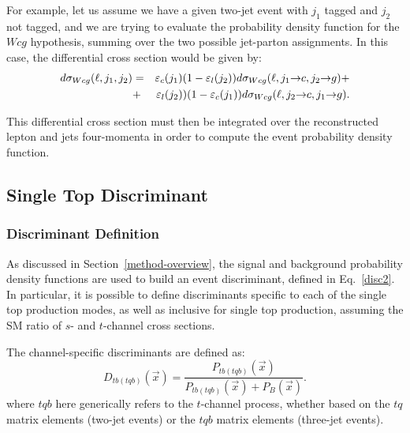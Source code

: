 For example, let us assume we have a given two-jet event with $j_1$
tagged and $j_2$ not tagged, and we are trying to evaluate the
probability density function for the $Wcg$ hypothesis, summing over
the two possible jet-parton assignments. In this case, the
differential cross section would be given by:
\begin{eqnarray}
\label{pxcomb_wcg}
d\sigma_{Wcg}(\ell, j_1, j_2)
&=& \varepsilon_{c}(j_1)(1-\varepsilon_{l}(j_2))
d\sigma_{Wcg}(\ell, j_1 {\rightarrow} c, j_2 {\rightarrow} g) + \nonumber \\ 
&+& \varepsilon_{l}(j_2))(1-\varepsilon_{c}(j_1))
d\sigma_{Wcg}(\ell, j_2 {\rightarrow} c, j_1 {\rightarrow} g).
\end{eqnarray}

This differential cross section must then be integrated over the
reconstructed lepton and jets four-momenta in order to compute the
event probability density function.

\subsection{Single Top Discriminant}

\subsubsection{Discriminant Definition}
\label{disc-def}

As discussed in Section~\ref{method-overview}, the signal and
background probability density functions are used to build an event
discriminant, defined in Eq.~\ref{disc2}. In particular, it is
possible to define discriminants specific to each of the single
top production modes, as well as inclusive for single top production, 
assuming the SM ratio of $s$- and $t$-channel cross sections.

The channel-specific discriminants are defined as:
\begin{equation}
D_{tb(tqb)}(\vec{x})
= \frac{P_{tb(tqb)}(\vec{x})}{P_{tb(tqb)}(\vec{x}) + P_{B}(\vec{x})}.
\label{disc1d}
\end{equation}
\noindent where $tqb$ here generically refers to the $t$-channel
process, whether based on the $tq$ matrix elements (two-jet events) or
the $tqb$ matrix elements (three-jet events).

